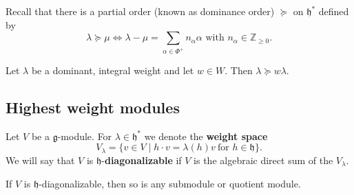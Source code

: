 \documentclass[12pt]{article}
\begin{document}
Recall that there is a partial order (known as dominance order) $\succeq$ on $\mathfrak{h}^*$ defined by
\[
    \lambda \succeq \mu \iff \lambda - \mu = \sum_{\alpha \in \Phi^+} n_\alpha \alpha \text{ with } n_\alpha \in \mathbb{Z}_{\geq 0}.
\]
\begin{proposition}
    Let $\lambda$ be a dominant, integral weight and let $w \in W$. Then $\lambda \succeq w\lambda$.
\end{proposition}

\subsection{Highest weight modules}
Let $V$ be a $\mathfrak{g}$-module. For $\lambda \in \mathfrak{h}^*$ we denote the \textbf{weight space}
\[
    V_\lambda = \{ v \in V \mid h \cdot v = \lambda(h)v \ \text{for } h \in \mathfrak{h} \}.
\]
We will say that $V$ is $\mathfrak{h}$-\textbf{diagonalizable} if $V$ is the algebraic direct sum of the $V_\lambda$.

\begin{proposition}
    If $V$ is $\mathfrak{h}$-diagonalizable, then so is any submodule or quotient module.
\end{proposition}
\end{document}
